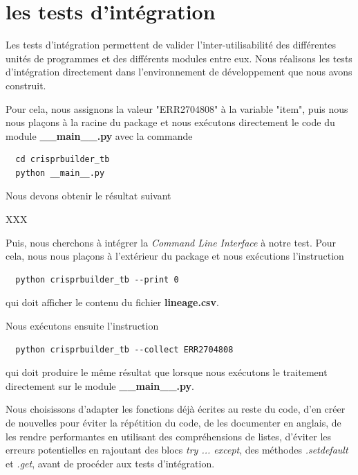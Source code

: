 \documentclass[twoside,a4paper,11pt,frenchb,openany]{report}
\begin{document}
\section{les tests d'intégration}

Les tests d'intégration permettent de valider l'inter-utilisabilité des différentes unités de programmes  et des différents modules entre eux. Nous réalisons les tests d'intégration directement dans l'environnement de développement que nous avons construit.

Pour cela, nous assignons la valeur "ERR2704808" à la variable "item", puis nous nous plaçons à la racine du package et nous exécutons directement le code du module \textbf{\_\_main\_\_.py} avec la commande 

\begin{verbatim}
  cd crisprbuilder_tb
  python __main__.py
\end{verbatim}

Nous devons obtenir le résultat suivant 

XXX

Puis, nous cherchons à intégrer la \textit{Command Line Interface} à notre test. Pour cela, nous nous plaçons à l'extérieur du package et nous exécutions l'instruction

\begin{verbatim}
  python crisprbuilder_tb --print 0
\end{verbatim}

qui doit afficher le contenu du fichier \textbf{lineage.csv}.

Nous exécutons ensuite l'instruction

\begin{verbatim}
  python crisprbuilder_tb --collect ERR2704808
\end{verbatim}

qui doit produire le même résultat que lorsque nous exécutons le traitement directement sur le module \textbf{\_\_main\_\_.py}.

Nous choisissons d'adapter les fonctions déjà écrites au reste du code, d'en créer de nouvelles pour éviter la répétition du code, de les documenter en anglais, de les rendre performantes en utilisant des compréhensions de listes, d'éviter les erreurs potentielles en rajoutant des blocs \textit{try ... except}, des méthodes \textit{.setdefault} et \textit{.get}, avant de procéder aux tests d'intégration.
\end{document}
